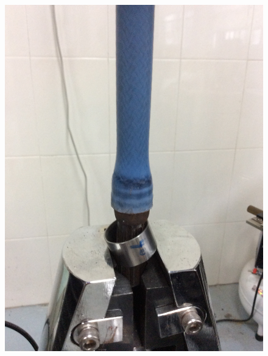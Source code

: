 \begin{figure}[!htb]
{		\includegraphics[height=0.25\textheight]{figure/experiment/E3-G3/Specimen/fail}
		\label{fig:fail}
	}
	\label{fig:fail-experiment-III}
\end{figure}


